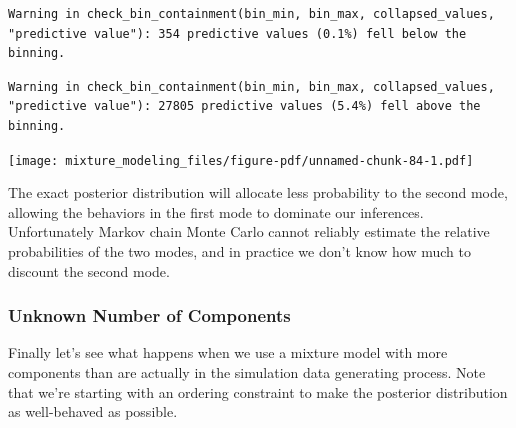 \documentclass[
  letterpaper,
  DIV=11,
  numbers=noendperiod]{scrartcl}
\newenvironment{Shaded}{\begin{snugshade}}{\end{snugshade}}
\newcommand{\AttributeTok}[1]{\textcolor[rgb]{0.40,0.45,0.13}{#1}}
\newcommand{\ControlFlowTok}[1]{\textcolor[rgb]{0.00,0.23,0.31}{#1}}
\newcommand{\DecValTok}[1]{\textcolor[rgb]{0.68,0.00,0.00}{#1}}
\newcommand{\FloatTok}[1]{\textcolor[rgb]{0.68,0.00,0.00}{#1}}
\newcommand{\FunctionTok}[1]{\textcolor[rgb]{0.28,0.35,0.67}{#1}}
\newcommand{\NormalTok}[1]{\textcolor[rgb]{0.00,0.23,0.31}{#1}}
\newcommand{\OtherTok}[1]{\textcolor[rgb]{0.00,0.23,0.31}{#1}}
\newcommand{\SpecialCharTok}[1]{\textcolor[rgb]{0.37,0.37,0.37}{#1}}
\newcommand{\StringTok}[1]{\textcolor[rgb]{0.13,0.47,0.30}{#1}}
\begin{document}
\begin{Shaded}
\end{Shaded}

\begin{verbatim}
Warning in check_bin_containment(bin_min, bin_max, collapsed_values,
"predictive value"): 354 predictive values (0.1%) fell below the binning.
\end{verbatim}

\begin{verbatim}
Warning in check_bin_containment(bin_min, bin_max, collapsed_values,
"predictive value"): 27805 predictive values (5.4%) fell above the binning.
\end{verbatim}

\texttt{[image: mixture\_modeling\_files/figure-pdf/unnamed-chunk-84-1.pdf]}

The exact posterior distribution will allocate less probability to the
second mode, allowing the behaviors in the first mode to dominate our
inferences. Unfortunately Markov chain Monte Carlo cannot reliably
estimate the relative probabilities of the two modes, and in practice we
don't know how much to discount the second mode.

\subsubsection{Unknown Number of
Components}\label{unknown-number-of-components}

Finally let's see what happens when we use a mixture model with more
components than are actually in the simulation data generating process.
Note that we're starting with an ordering constraint to make the
posterior distribution as well-behaved as possible.
\end{document}

